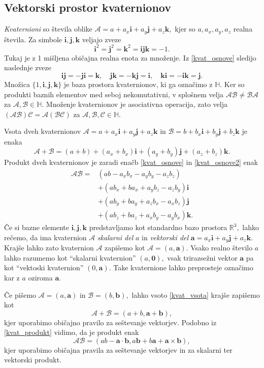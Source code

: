 \documentclass[12pt,a4paper,twoside]{article}
\theoremstyle{definition} %
\theoremstyle{plain} %
\theoremstyle{primerstyle}
\numberwithin{equation}{section}  %
\newcommand{\R}{\mathbb R}
\newcommand{\quat}{\mathbb H}
\newcommand{\aV}{\mathbf{a}}
\newcommand{\bV}{\mathbf{b}}
\newcommand{\iV}{\mathbf{i}}
\newcommand{\jV}{\mathbf{j}}
\newcommand{\kV}{\mathbf{k}}
\newcommand{\AQ}{\mathcal{A}}
\newcommand{\BQ}{\mathcal{B}}
\newcommand{\CQ}{\mathcal{C}}
\begin{document}
\subsection{Vektorski prostor kvaternionov}
\label{kvaternioni_poglavje}

\emph{Kvaternioni} so števila oblike $\AQ=a+a_x\iV+a_y\jV+a_z\kV,$ kjer so $a,a_x,a_y,a_z$ realna števila. Za simbole $\iV,\jV,\kV$ veljajo zveze
\begin{equation}
	\label{kvat_osnove}
	\iV^2=\jV^2=\kV^2=\iV\jV\kV=-1.
\end{equation}
Tukaj je z 1 mišljena običajna realna enota za množenje. Iz \eqref{kvat_osnove} sledijo naslednje zveze
\begin{equation}
	\label{kvat_osnove2}
	\iV\jV=-\jV\iV=\kV,\quad\jV\kV=-\kV\jV=\iV,\quad\kV\iV=-\iV\kV=\jV.
\end{equation}
Množica $\{1,\iV,\jV,\kV\}$ je baza prostora kvaternionov, ki ga označimo z $\quat.$ Ker so produkti baznih elementov med seboj nekomutativni, v splošnem velja $\AQ\BQ\neq\BQ\AQ$ za $\AQ,\BQ\in\quat.$ Množenje kvaternionov je asociativna operacija, zato velja $(\AQ\BQ)\CQ=\AQ(\BQ\CQ)$ za $\AQ,\BQ,\CQ\in\quat.$

Vsota dveh kvaternionov $\AQ=a+a_x\iV+a_y\jV+a_z\kV$ in $\BQ=b+b_x\iV+b_y\jV+b_z\kV$ je enaka
\begin{equation}
	\label{kvat_vsota}
	\AQ+\BQ=(a+b)+(a_x+b_x)\iV+(a_y+b_y)\jV+(a_z+b_z)\kV.
\end{equation}
Produkt dveh kvaternionov je zaradi enačb \eqref{kvat_osnove} in \eqref{kvat_osnove2} enak
\begin{align}
	\AQ\BQ=&(ab-a_xb_x-a_yb_y-a_zb_z)\nonumber\\
	&+(ab_x+ba_x+a_yb_z-a_zb_y)\iV\label{kvat_produkt}\\
	&+(ab_y+ba_y+a_zb_x-a_xb_z)\jV\nonumber\\
	&+(ab_z+ba_z+a_xb_y-a_yb_x)\kV.\nonumber
\end{align}
Če si bazne elemente $\iV,\jV,\kV$ predstavljamo kot standardno bazo prostora $\R^3,$ lahko rečemo, da ima kvaternion $\AQ$ \emph{skalarni del} $a$ in \emph{vektorski del} $\aV=a_x\iV+a_y\jV+a_z\kV.$ Krajše lahko zato kvaternion $\AQ$ zapišemo kot $\AQ=(a,\aV).$ Vsako realno število $a$ lahko razumemo kot ``skalarni kvaternion'' $(a,\mathbf{0}),$ vsak trirazsežni vektor $\aV$ pa kot ``vektoski kvaternion'' $(0,\aV).$ Take kvaternione lahko preprosteje označimo kar z $a$ oziroma $\aV.$

Če pišemo $\AQ=(a,\aV)$ in $\BQ=(b,\bV),$ lahko vsoto \eqref{kvat_vsota} krajše zapišemo kot
\begin{equation}
	\label{kvat_vsota2}
	\AQ+\BQ=(a+b,\aV+\bV),
\end{equation}
kjer uporabimo običajno pravilo za seštevanje vektorjev. Podobno iz \eqref{kvat_produkt} vidimo, da je produkt enak
\begin{equation}
	\label{kvat_produkt2}
	\AQ\BQ=(ab-\aV\cdot\bV,a\bV+b\aV+\aV\times\bV),
\end{equation}
kjer uporabimo običajna pravila za seštevanje vektorjev in za skalarni ter vektorski produkt.
\end{document}
